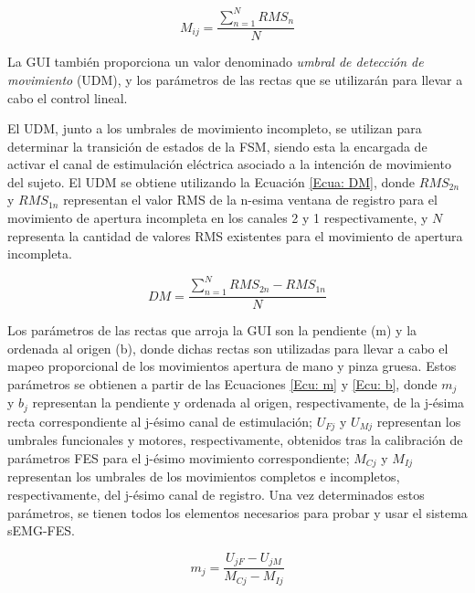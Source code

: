 
\begin{equation}
	M_{ij} = \frac{\sum_{n=1}^{N}RMS_{n}}{N}
	\label{Ecu: U_RMS}
\end{equation}

La GUI también proporciona un valor denominado \emph{umbral de detección de movimiento} (UDM), y los parámetros de las rectas que se utilizarán para llevar a cabo el control lineal.

El UDM, junto a los umbrales de movimiento incompleto, se utilizan para determinar la transición de estados de la FSM, siendo esta la encargada de activar el canal de estimulación eléctrica asociado a la intención de movimiento del sujeto. El UDM se obtiene utilizando la Ecuación \ref{Ecua: DM}, donde $RMS_{2n}$ y $RMS_{1n}$ representan el valor RMS de la n-esima ventana de registro para el movimiento de apertura incompleta en los canales 2 y 1 respectivamente, y $N$ representa la cantidad de valores RMS existentes para el movimiento de apertura incompleta.

\begin{equation}
	DM = \frac{\sum_{n=1}^{N}RMS_{2n}-RMS_{1n}}{N}
	\label{Ecua: DM}
\end{equation}

Los parámetros de las rectas que arroja la GUI son la pendiente (m) y la ordenada al origen (b), donde dichas rectas son utilizadas para llevar a cabo el mapeo proporcional de los movimientos apertura de mano y pinza gruesa. Estos parámetros se obtienen a partir de las Ecuaciones \ref{Ecu: m} y \ref{Ecu: b}, donde $m_{j}$ y $b_{j}$ representan la pendiente y ordenada al origen, respectivamente, de la j-ésima recta correspondiente al j-ésimo canal de estimulación; $U_{Fj}$ y $U_{Mj}$ representan los umbrales funcionales y motores, respectivamente, obtenidos tras la calibración de parámetros FES para el j-ésimo movimiento correspondiente; $M_{Cj}$ y $M_{Ij}$ representan los umbrales de los movimientos completos e incompletos, respectivamente, del j-ésimo canal de registro. Una vez determinados estos parámetros, se tienen todos los elementos necesarios para probar y usar el sistema sEMG-FES.

\begin{equation}
	m_{j} = \frac{ U_{jF} - U_{jM} }{ M_{Cj} - M_{Ij} }
	\label{Ecu: m}
\end{equation}

